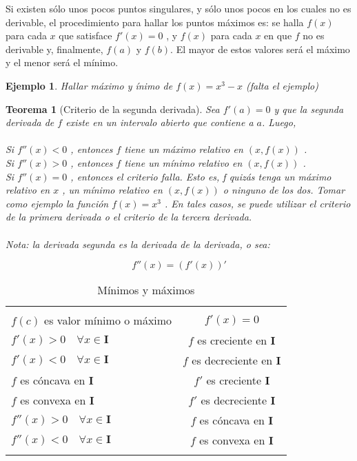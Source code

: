 \documentclass[12pt,a4paper]{extarticle}
\newtheorem{theorem}{Teorema}[section]
\newtheorem{ejs}{Ejemplo}[section]
\begin{document}
Si existen s\'olo unos pocos puntos singulares, y s\'olo unos pocos en
los cuales no es derivable, el procedimiento para hallar los puntos
m\'aximos es: se halla \( f(x) \) para cada \( x \) que satisface \(
f'(x)=0 \) , y \( f(x) \) para cada \( x \) en que \( f \) no es
derivable y, finalmente, \( f(a) \) y \( f(b) \). El mayor de estos
valores ser\'a el m\'aximo y el menor ser\'a el m\'inimo.

\begin{ejs}{Hallar m\'aximo y \'inimo de \( f(x)=x^3-x \)}
(falta el ejemplo)
\end{ejs}

\begin{theorem}[Criterio de la segunda derivada]
Sea \(f'(a)=0\) y que la segunda derivada de \(f\) existe en un
intervalo abierto que contiene a \(a\). Luego, \\
\\
Si \( f ''(x) < 0 \) , entonces \( f \)  tiene un máximo relativo en \( (x, f(x)) \) .\\
Si \( f ''(x) > 0 \) , entonces \( f \)  tiene un mínimo relativo en \( (x, f(x)) \) .\\
Si \( f ''(x) = 0 \) , entonces el criterio falla. Esto es, f quizás
tenga un máximo relativo en \( x \) , un mínimo relativo en \( (x,
f(x)) \)  o ninguno de los dos. Tomar como ejemplo la función \( f(x)
= x^3 \) . En tales casos, se puede utilizar el criterio de la primera
derivada o el criterio de la tercera derivada.\\
\\
Nota: la derivada segunda es la derivada de la derivada, o sea:

\[ f''(x)= (f'(x))' \]

\end{theorem}

\begin{table}[!htbp]
\caption{M\'inimos y m\'aximos}
\begin{tabular}{ l c }
\hline & \\[0.25em]
\(f(c)\)  es valor m\'inimo o m\'aximo &   \(f'(x) = 0 \) \\[1em]
\( f'(x) > 0 \quad \forall x \in \mathbf{I} \) &  \(f\)  es creciente en \textbf{I}\\[1em]
\( f'(x) < 0 \quad \forall x \in \mathbf{I} \) &  \(f\) es decreciente
en \textbf{I}\\[1em]
\(f\) es c\'oncava en \(\mathbf{I}\) & \(f'\) es creciente
\(\mathbf{I}\)\\[1em]
\(f\) es convexa en \(\mathbf{I}\) & \(f'\) es decreciente
\(\mathbf{I}\)\\[1em]
\(f''(x) > 0  \quad \forall x \in \mathbf{I}\) & \(f\) es c\'oncava en
\textbf{I}\\[1em]
\(f''(x) < 0  \quad \forall x \in \mathbf{I}\) & \(f\) es convexa en
\textbf{I}\\[1em]
\hline\\
\end{tabular}
\label{tab:minmax}
\end{table}
\vspace{0.5em}
\end{document}
